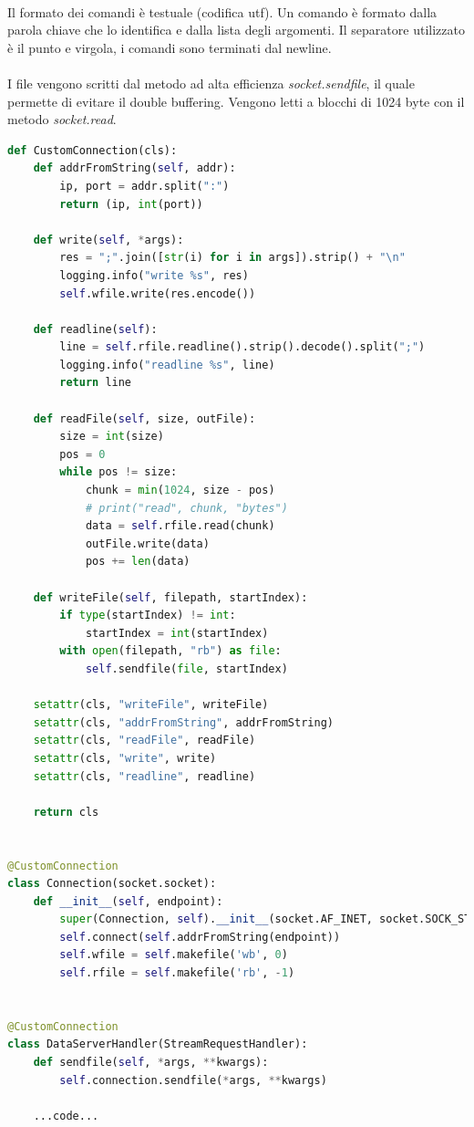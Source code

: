 \documentclass{article}
\begin{document}
\paragraph{} Il formato dei comandi è testuale (codifica utf). Un comando è formato dalla parola chiave che lo identifica e dalla lista degli argomenti. Il separatore utilizzato è il punto e virgola, i comandi sono terminati dal newline.

\paragraph{} I file vengono scritti dal metodo ad alta efficienza \emph{socket.sendfile}, il quale permette di evitare il double buffering. Vengono letti a blocchi di 1024 byte con il metodo \emph{socket.read}.

\begin{lstlisting}[language=Python, title=Codice]
def CustomConnection(cls):
    def addrFromString(self, addr):
        ip, port = addr.split(":")
        return (ip, int(port))

    def write(self, *args):
        res = ";".join([str(i) for i in args]).strip() + "\n"
        logging.info("write %s", res)
        self.wfile.write(res.encode())

    def readline(self):
        line = self.rfile.readline().strip().decode().split(";")
        logging.info("readline %s", line)
        return line

    def readFile(self, size, outFile):
        size = int(size)
        pos = 0
        while pos != size:
            chunk = min(1024, size - pos)
            # print("read", chunk, "bytes")
            data = self.rfile.read(chunk)
            outFile.write(data)
            pos += len(data)

    def writeFile(self, filepath, startIndex):
        if type(startIndex) != int:
            startIndex = int(startIndex)
        with open(filepath, "rb") as file:
            self.sendfile(file, startIndex)

    setattr(cls, "writeFile", writeFile)
    setattr(cls, "addrFromString", addrFromString)
    setattr(cls, "readFile", readFile)
    setattr(cls, "write", write)
    setattr(cls, "readline", readline)

    return cls


@CustomConnection
class Connection(socket.socket):
    def __init__(self, endpoint):
        super(Connection, self).__init__(socket.AF_INET, socket.SOCK_STREAM)
        self.connect(self.addrFromString(endpoint))
        self.wfile = self.makefile('wb', 0)
        self.rfile = self.makefile('rb', -1)


@CustomConnection
class DataServerHandler(StreamRequestHandler):
    def sendfile(self, *args, **kwargs):
        self.connection.sendfile(*args, **kwargs)
    
    ...code...

\end{lstlisting}
\end{document}
